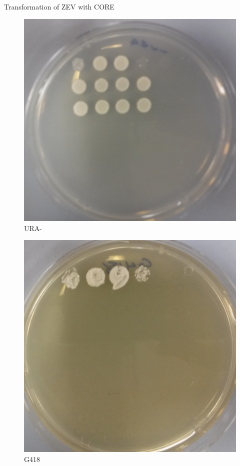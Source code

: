 \documentclass{beamer}
\begin{document}
\begin{frame}{Transformation of ZEV with CORE}
    \begin{minipage}[ht!]{0.4\textwidth}
    \begin{figure}[ht!]
        \centering
        \includegraphics[width=.8\textwidth]{URA.png}
        \caption{URA-}
        \label{fig:ura}
    \end{figure}
    \begin{figure}[ht!]
        \centering
        \includegraphics[width=.8\textwidth]{G418.png}
        \caption{G418}
        \label{fig:g418}
    \end{figure}
    \end{minipage}

\end{frame}
\end{document}
